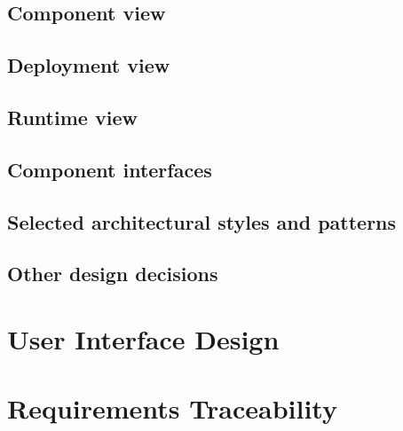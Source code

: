 \documentclass[10pt,openany]{book}
\begin{document}
		

	\section{Component view}

		

	\section{Deployment view}

		

	\section{Runtime view}

		

	\section{Component interfaces}

		

	\section{Selected architectural styles and patterns}

		

	\section{Other design decisions}

		

\chapter{User Interface Design}\label{chapt:sum}

		

\chapter{Requirements Traceability}\label{chapt:sum}
\end{document}
